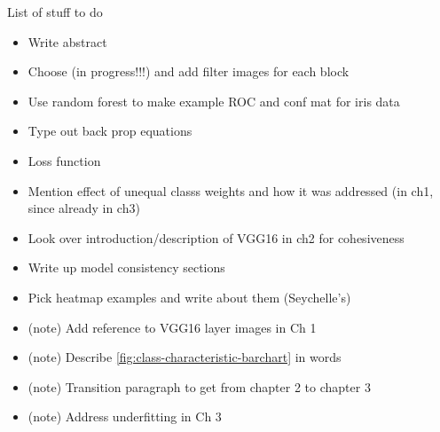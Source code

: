 
List of stuff to do

\begin{itemize}
\item Write abstract
\item Choose (in progress!!!) and add filter images for each block
\item Use random forest to make example ROC and conf mat for iris data
\item Type out back prop equations
\item Loss function
\item Mention effect of unequal classs weights and how it was addressed (in ch1, since already in ch3)
\item Look over introduction/description of VGG16 in ch2 for cohesiveness
\item Write up model consistency sections
\item Pick heatmap examples and write about them (Seychelle's)
\item (\fix note) Add reference to VGG16 layer images in Ch 1
\item (\fix note) Describe \autoref{fig:class-characteristic-barchart} in words
\item (\fix note) Transition paragraph to get from chapter 2 to chapter 3
\item (\fix note) Address underfitting in Ch 3
\end{itemize}
